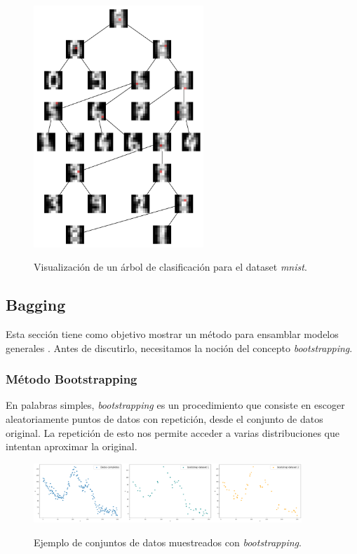 \begin{figure}[H]
    \centering
    \includegraphics[width=0.57\textwidth]{img/capN_interpretacion_arbol.png}\\
    \caption{Visualización de un árbol de clasificación para el dataset \textit{mnist}.}
    \label{fig:arbol_interpretabilidad}
\end{figure}


\subsection{Bagging}
\label{sec:bagging}

Esta sección tiene como objetivo mostrar un método para ensamblar modelos generales \cite{bagging}. Antes de discutirlo, necesitamos la noción del concepto \textit{bootstrapping}.

\subsubsection{Método Bootstrapping}

En palabras simples, \textit{bootstrapping} es un procedimiento que consiste en escoger aleatoriamente puntos de datos con repetición, desde el conjunto de datos original. La repetición de esto nos permite acceder a varias distribuciones que intentan aproximar la original.

\begin{figure}[h]
	\centering
	\includegraphics[width=0.9\textwidth]{img/capN_bootstrapping.png}\\
	\caption{Ejemplo de conjuntos de datos muestreados con \textit{bootstrapping}.}
\end{figure}

